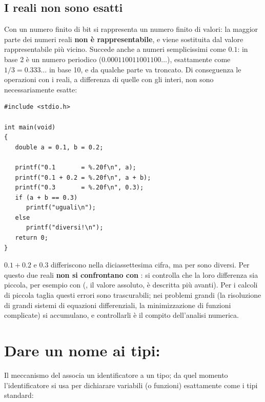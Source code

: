 \subsection{I reali non sono esatti}

Con un numero finito di bit si rappresenta un numero finito di valori: la
maggior parte dei numeri reali \textbf{non è rappresentabile}, e viene
sostituita dal valore rappresentabile più vicino. Succede anche a numeri
semplicissimi come $0.1$: in base 2 è un numero periodico
($0.000110011001100\dots$), esattamente come $1/3 = 0.333\dots$ in base 10,
e da qualche parte va troncato. Di conseguenza le operazioni con i reali,
a differenza di quelle con gli interi, non sono necessariamente esatte:

\begin{affianco}[0.5][c]
\begin{lstlisting}[style=c, name=decimali.c]
#include <stdio.h>

int main(void)
{
   double a = 0.1, b = 0.2;

   printf("0.1       = %.20f\n", a);
   printf("0.1 + 0.2 = %.20f\n", a + b);
   printf("0.3       = %.20f\n", 0.3);
   if (a + b == 0.3)
      printf("uguali\n");
   else
      printf("diversi!\n");
   return 0;
}
\end{lstlisting}
\risultato
{}
\end{affianco}

$0.1 + 0.2$ e $0.3$ differiscono nella diciassettesima cifra, ma per
\code{==} sono diversi. Per questo due reali \textbf{non si confrontano con
\code{==}}: si controlla che la loro differenza sia piccola, per esempio con
 (, il valore assoluto, è descritta
più avanti). Per i calcoli di piccola taglia questi errori sono trascurabili;
nei problemi grandi (la risoluzione di grandi sistemi di equazioni
differenziali, la minimizzazione di funzioni complicate) si accumulano, e
controllarli è il compito dell'analisi numerica.

\section{Dare un nome ai tipi: }

Il meccanismo del  associa un identificatore a un tipo; da quel
momento l'identificatore si usa per dichiarare variabili (o funzioni)
esattamente come i tipi standard:

